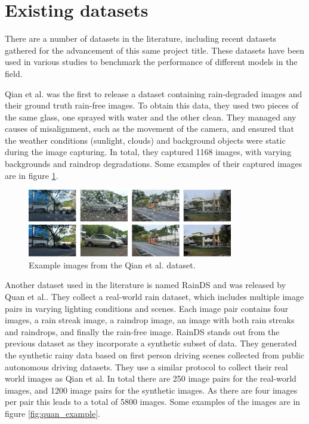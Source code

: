 \documentclass[11pt]{ociamthesis}  %
\begin{document}
\section{Existing datasets}

There are a number of datasets in the literature, including recent datasets gathered for the advancement of this same project title. These datasets have been used in various studies to benchmark the performance of different models in the field.

Qian et al.\cite{qian2018attentive} was the first to release a dataset containing rain-degraded images and their ground truth rain-free images. To obtain this data, they used two pieces of the same glass, one sprayed with water and the other clean. They managed any causes of misalignment, such as the movement of the camera, and ensured that the weather conditions (sunlight, clouds) and background objects were static during the image capturing. In total, they captured 1168 images, with varying backgrounds and raindrop degradations. Some examples of their captured images are in figure \ref{fig:qian_example}.

\begin{figure}[ht]
    \centering
    \includegraphics[width=0.8\textwidth, height=0.4\textheight, keepaspectratio]{figures/Qian et al dataset examples.png}
    \caption{Example images from the Qian et al. dataset.}
    \label{fig:qian_example}
\end{figure}

Another dataset used in the literature is named RainDS and was released by Quan et al.\cite{quan2021removing}. They collect a real-world rain dataset, which includes multiple image pairs in varying lighting conditions and scenes. Each image pair contains four images, a rain streak image, a raindrop image, an image with both rain streaks and raindrops, and finally the rain-free image. RainDS stands out from the previous dataset as they incorporate a synthetic subset of data. They generated the synthetic rainy data based on first person driving scenes collected from public autonomous driving datasets. They use a similar protocol to collect their real world images as Qian et al. In total there are 250 image pairs for the real-world images, and 1200 image pairs for the synthetic images. As there are four images per pair this leads to a total of 5800 images. Some examples of the images are in figure \ref{fig:quan_example}.
\end{document}
